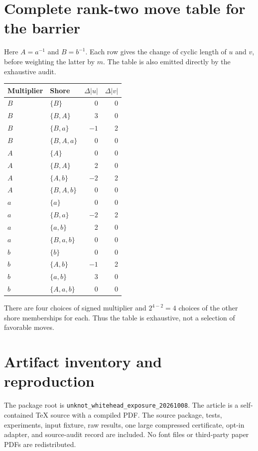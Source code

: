 \documentclass[11pt,letterpaper]{article}
\theoremstyle{definition}\newtheorem{definition}[theorem]{Definition}
\newcommand{\set}[1]{\{#1\}}
\begin{document}
\section{Complete rank-two move table for the barrier}\label{app:movetable}
Here $A=a^{-1}$ and $B=b^{-1}$. Each row gives the change of cyclic length of $u$ and $v$, before weighting the latter by $m$. The table is also emitted directly by the exhaustive audit.
\begin{center}
\begin{tabular}{llrr}
\toprule Multiplier & Shore & $\Delta|u|$ & $\Delta|v|$\\\midrule
$B$ & $\set{B}$ & 0&0\\
$B$ & $\set{B,A}$ & 3&0\\
$B$ & $\set{B,a}$ & $-1$&2\\
$B$ & $\set{B,A,a}$ &0&0\\
$A$ & $\set{A}$ &0&0\\
$A$ & $\set{B,A}$ &2&0\\
$A$ & $\set{A,b}$ &$-2$&2\\
$A$ & $\set{B,A,b}$ &0&0\\
$a$ & $\set{a}$ &0&0\\
$a$ & $\set{B,a}$ &$-2$&2\\
$a$ & $\set{a,b}$ &2&0\\
$a$ & $\set{B,a,b}$ &0&0\\
$b$ & $\set{b}$ &0&0\\
$b$ & $\set{A,b}$ &$-1$&2\\
$b$ & $\set{a,b}$ &3&0\\
$b$ & $\set{A,a,b}$ &0&0\\\bottomrule
\end{tabular}
\end{center}
There are four choices of signed multiplier and $2^{4-2}=4$ choices of the other shore memberships for each. Thus the table is exhaustive, not a selection of favorable moves.

\section{Artifact inventory and reproduction}\label{app:reproduction}
The package root is \texttt{unknot\_whitehead\_exposure\_20261008}. The article is a self-contained TeX source with a compiled PDF. The source package, tests, experiments, input fixture, raw results, one large compressed certificate, opt-in adapter, and source-audit record are included. No font files or third-party paper PDFs are redistributed.
\end{document}
